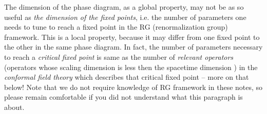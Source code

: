 The dimension of the phase diagram, as a global property, may not be as so useful as \emph{the dimension of the fixed points}, i.e. the number of parameters one needs to tune to reach a fixed point in the RG (renormalization group) framework. This is a local property, because it may differ from one fixed point to the other in the same phase diagram. In fact, the number of parameters necessary to reach a \emph{critical fixed point} is same as the number of \emph{relevant operators} (operators whose scaling dimension is less then the spacetime dimension \label{page: first instance of relevant operators}) in the \emph{conformal field theory} which describes that critical fixed point -- more on that below! Note that we do not require knowledge of RG framework in these notes, so please remain comfortable if you did not understand what this paragraph is about. 


